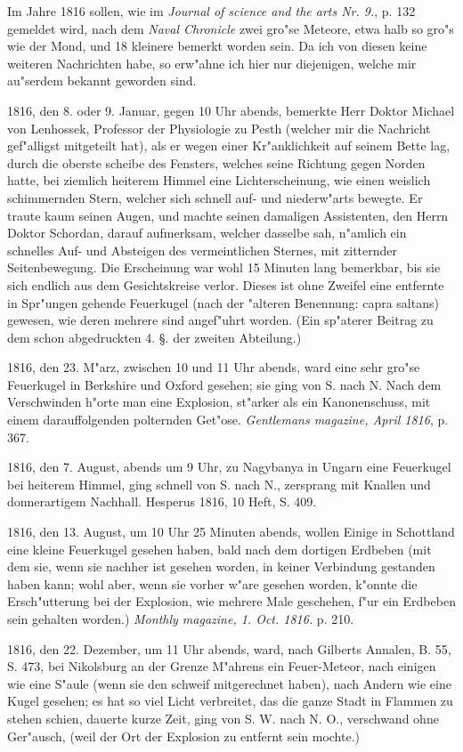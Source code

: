 \documentclass[a4paper, 11pt, oneside, polutonikogreek, german]{article}
\begin{document}
Im Jahre 1816 sollen, wie im \emph{Journal of science and the arts Nr. 9.}, p. 132 gemeldet wird, nach dem \emph{Naval Chronicle} zwei gro"se Meteore, etwa halb so gro"s wie der Mond, und 18 kleinere bemerkt worden sein. Da ich von diesen keine weiteren Nachrichten habe, so erw"ahne ich hier nur diejenigen, welche mir au"serdem bekannt geworden sind.

1816, den 8. oder 9. Januar, gegen 10 Uhr abends, bemerkte Herr Doktor Michael von Lenhossek, Professor der Physiologie zu Pesth (welcher mir die Nachricht gef"alligst mitgeteilt hat), als er wegen einer Kr"anklichkeit auf seinem Bette lag, durch die oberste scheibe des Fensters, welches seine Richtung gegen Norden hatte, bei ziemlich heiterem Himmel eine Lichterscheinung, wie einen weislich schimmernden Stern, welcher sich schnell auf- und niederw"arts bewegte. Er traute kaum seinen Augen, und machte seinen damaligen Assistenten, den Herrn Doktor Schordan, darauf aufmerksam, welcher dasselbe sah, n"amlich ein schnelles Auf- und Absteigen des vermeintlichen Sternes, mit zitternder Seitenbewegung. Die Erscheinung war wohl 15 Minuten lang bemerkbar, bis sie sich endlich aus dem Gesichtskreise verlor. Dieses ist ohne Zweifel eine entfernte in Spr"ungen gehende Feuerkugel (nach der "alteren Benennung: capra saltans) gewesen, wie deren mehrere sind angef"uhrt worden. (Ein sp"aterer Beitrag zu dem schon abgedruckten 4. §. der zweiten Abteilung.)

1816, den 23. M"arz, zwischen 10 und 11 Uhr abends, ward eine sehr gro"se Feuerkugel in Berkshire und Oxford gesehen; sie ging von S. nach N. Nach dem Verschwinden h"orte man eine Explosion, st"arker als ein Kanonenschuss, mit einem darauffolgenden polternden Get"ose. \emph{Gentlemans magazine, April 1816}, p. 367.

1816, den 7. August, abends um 9 Uhr, zu Nagybanya in Ungarn eine Feuerkugel bei heiterem Himmel, ging schnell von S. nach N., zersprang mit Knallen und donnerartigem Nachhall. Hesperus 1816, 10 Heft, S. 409.

1816, den 13. August, um 10 Uhr 25 Minuten abends, wollen Einige in Schottland eine kleine Feuerkugel gesehen haben, bald nach dem dortigen Erdbeben (mit dem sie, wenn sie nachher ist gesehen worden, in keiner Verbindung gestanden haben kann; wohl aber, wenn sie vorher w"are gesehen worden, k"onnte die Ersch"utterung bei der Explosion, wie mehrere Male geschehen, f"ur ein Erdbeben sein gehalten worden.) \emph{Monthly magazine, 1. Oct. 1816.} p. 210.

1816, den 22. Dezember, um 11 Uhr abends, ward, nach Gilberts Annalen, B. 55, S. 473, bei Nikolsburg an der Grenze M"ahrens ein Feuer-Meteor, nach einigen wie eine S"aule (wenn sie den schweif mitgerechnet haben), nach Andern wie eine Kugel gesehen; es hat so viel Licht verbreitet, das die ganze Stadt in Flammen zu stehen schien, dauerte kurze Zeit, ging von S. W. nach N. O., verschwand ohne Ger"ausch, (weil der Ort der Explosion zu entfernt sein mochte.)
\end{document}
